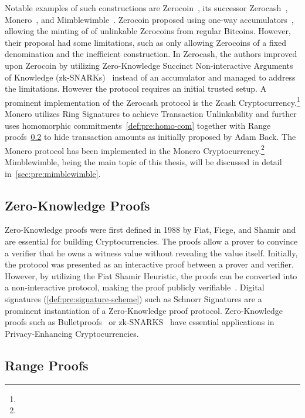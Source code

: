 Notable examples of such constructions are Zerocoin~\cite{miers2013zerocoin}, its successor Zerocash~\cite{sasson2014zerocash}, Monero~\cite{noether2015ring}, and Mimblewimble~\cite{jedusor2016mimblewimble}.
Zerocoin proposed using one-way accumulators~\cite{benaloh1993one}, allowing the minting of of unlinkable Zerocoins from regular Bitcoins.
However, their proposal had some limitations, such as only allowing Zerocoins of a fixed denomination and the inefficient construction.
In Zerocash, the authors improved upon Zerocoin by utilizing Zero-Knowledge Succinct Non-interactive Arguments of Knowledge (zk-SNARKs)~\cite{bitansky2012extractable} instead of an accumulator and managed to address the limitations.
However the protocol requires an initial trusted setup.
A prominent implementation of the Zerocash protocol is the Zcash Cryptocurrency.\footnote{\urlzcash}
Monero utilizes Ring Signatures to achieve Transaction Unlinkability and further uses homomorphic commitments~\cref{def:pre:homo-com} together with Range proofs~\cref{sec:pre:rangeproof} to hide transaction amounts as initially proposed by Adam Back.
The Monero protocol has been implemented in the Monero Cryptocurrency.\footnote{\urlmonero}
Mimblewimble, being the main topic of this thesis, will be discussed in detail in~\cref{sec:pre:mimblewimble}.

\subsection{Zero-Knowledge Proofs} \label{sec:pre:privacy:zeroknowlegde}

Zero-Knowledge proofs were first defined in 1988 by Fiat, Fiege, and Shamir and are essential for building Cryptocurrencies.
The proofs allow a prover to convince a verifier that he owns a witness value without revealing the value itself.
Initially, the protocol was presented as an interactive proof between a prover and verifier.
However, by utilizing the Fiat Shamir Heuristic, the proofs can be converted into a non-interactive protocol, making the proof publicly verifiable~\cite{feige1988zero}.
Digital signatures (\cref{def:pre:signature-scheme}) such as Schnorr Signatures are a prominent instantiation of a Zero-Knowledge proof protocol.
Zero-Knowledge proofs such as Bulletproofs~\cite{bunz2018bulletproofs} or zk-SNARKS~\cite{bitansky2012extractable} have essential applications in Privacy-Enhancing Cryptocurrencies.

\subsection{Range Proofs} \label{sec:pre:rangeproof}

